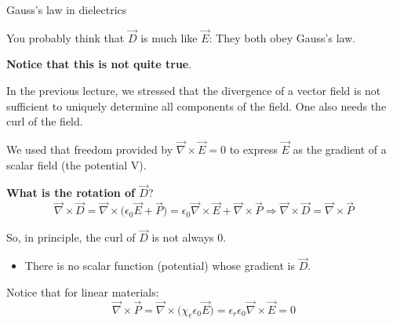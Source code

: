 \begin{frame}{Gauss's law in dielectrics}

{\small

You probably think that $\vec{D}$ is much like $\vec{E}$: They both obey Gauss's law. \\
\vspace{0.1cm}

{\bf Notice that this is not quite true}.\\
\vspace{0.1cm}

In the previous lecture, we stressed that the divergence of a vector field
is not sufficient to uniquely determine all components of the field.
One also needs the curl of the field.\\
\vspace{0.2cm}

We used that freedom provided by $\vec{\nabla} \times \vec{E} = 0$
to express $\vec{E}$ as the gradient of a scalar field (the potential V).\\
\vspace{0.2cm}

{\bf What is the rotation of $\vec{D}$}?\\
\begin{equation*}
   \vec{\nabla} \times \vec{D} =
   \vec{\nabla} \times \Big( \epsilon_0 \vec{E} + \vec{P} \Big) =
   \epsilon_0  \vec{\nabla} \times \vec{E} + \vec{\nabla} \times \vec{P} \Rightarrow
   \vec{\nabla} \times \vec{D} = \vec{\nabla} \times \vec{P}
\end{equation*}

So, in principle, the curl of $\vec{D}$ is not always 0.
\begin{itemize}
   \item There is no scalar function (potential) whose gradient is $\vec{D}$.
\end{itemize}

Notice that for linear materials:
\begin{equation*}
  \vec{\nabla} \times \vec{P} =
  \vec{\nabla} \times \Big( \chi_{e} \epsilon_0 \vec{E} \Big) =
  \epsilon_{r} \epsilon_0 \vec{\nabla} \times \vec{E} = 0
\end{equation*}

}

\end{frame}

%
%
%

